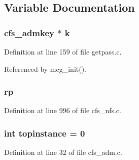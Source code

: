 \subsection{Variable Documentation}
\subsubsection{\setlength{\rightskip}{0pt plus 5cm}cfs\_\-admkey $\ast$ {\bf k}}\label{cfs__adm_8c_a3}




Definition at line 159 of file getpass.c.

Referenced by mcg\_\-init().
\subsubsection{ {\bf rp}}\label{cfs__adm_8c_a2}




Definition at line 996 of file cfs\_\-nfs.c.
\subsubsection{\setlength{\rightskip}{0pt plus 5cm}int {\bf topinstance} = 0}\label{cfs__adm_8c_a1}




Definition at line 32 of file cfs\_\-adm.c.